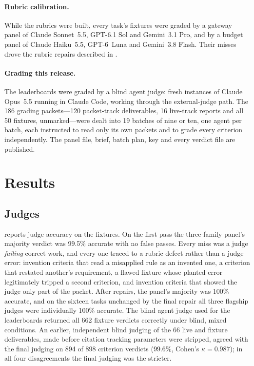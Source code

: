 \documentclass[11pt,a4paper]{article}
\begin{document}
\paragraph{Rubric calibration.} While the rubrics were built, every task's fixtures were graded by a gateway panel of Claude Sonnet~5.5, GPT-6.1 Sol and Gemini~3.1 Pro, and by a budget panel of Claude Haiku~5.5, GPT-6~Luna and Gemini~3.8 Flash. Their misses drove the rubric repairs described in .

\paragraph{Grading this release.} The leaderboards were graded by a blind agent judge: fresh instances of Claude Opus~5.5 running in Claude Code, working through the external-judge path. The 186 grading packets---120 packet-track deliverables, 16 live-track reports and all 50 fixtures, unmarked---were dealt into 19 batches of nine or ten, one agent per batch, each instructed to read only its own packets and to grade every criterion independently. The panel file, brief, batch plan, key and every verdict file are published.

\section{Results}
\label{sec:results}

\subsection{Judges}
\label{sec:calibration}

 reports judge accuracy on the fixtures. On the first pass the three-family panel's majority verdict was 99.5\% accurate with no false passes. Every miss was a judge \emph{failing} correct work, and every one traced to a rubric defect rather than a judge error: invention criteria that read a misapplied rule as an invented one, a criterion that restated another's requirement, a flawed fixture whose planted error legitimately tripped a second criterion, and invention criteria that showed the judge only part of the packet. After repairs, the panel's majority was 100\% accurate, and on the sixteen tasks unchanged by the final repair all three flagship judges were individually 100\% accurate. The blind agent judge used for the leaderboards returned all 662 fixture verdicts correctly under blind, mixed conditions. An earlier, independent blind judging of the 66 live and fixture deliverables, made before citation tracking parameters were stripped, agreed with the final judging on 894 of 898 criterion verdicts (99.6\%, Cohen's $\kappa = 0.987$); in all four disagreements the final judging was the stricter.
\end{document}
